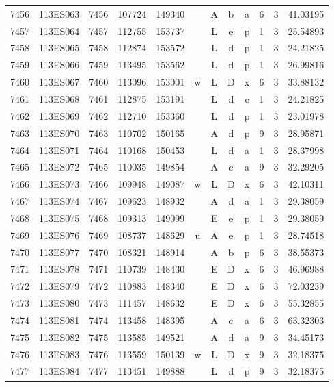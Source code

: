 \begin{tabular}{|*{12}{c|}}
7456 & 113ES063 & 7456 & 107724 & 149340 &  & A & b & a & 6 & 3 & 41.03195 \\ 
7457 & 113ES064 & 7457 & 112755 & 153737 &  & L & e & p & 1 & 3 & 25.54893 \\ 
7458 & 113ES065 & 7458 & 112874 & 153572 &  & L & d & p & 1 & 3 & 24.21825 \\ 
7459 & 113ES066 & 7459 & 113495 & 153562 &  & L & d & p & 1 & 3 & 26.99816 \\ 
7460 & 113ES067 & 7460 & 113096 & 153001 & w & L & D & x & 6 & 3 & 33.88132 \\ 
7461 & 113ES068 & 7461 & 112875 & 153191 &  & L & d & c & 1 & 3 & 24.21825 \\ 
7462 & 113ES069 & 7462 & 112710 & 153360 &  & L & d & p & 1 & 3 & 23.01978 \\ 
7463 & 113ES070 & 7463 & 110702 & 150165 &  & A & d & p & 9 & 3 & 28.95871 \\ 
7464 & 113ES071 & 7464 & 110168 & 150453 &  & L & d & a & 1 & 3 & 28.37998 \\ 
7465 & 113ES072 & 7465 & 110035 & 149854 &  & A & c & a & 9 & 3 & 32.29205 \\ 
7466 & 113ES073 & 7466 & 109948 & 149087 & w & L & D & x & 6 & 3 & 42.10311 \\ 
7467 & 113ES074 & 7467 & 109623 & 148932 &  & A & d & a & 1 & 3 & 29.38059 \\ 
7468 & 113ES075 & 7468 & 109313 & 149099 &  & E & e & p & 1 & 3 & 29.38059 \\ 
7469 & 113ES076 & 7469 & 108737 & 148629 & u & A & e & p & 1 & 3 & 28.74518 \\ 
7470 & 113ES077 & 7470 & 108321 & 148914 &  & A & b & p & 6 & 3 & 38.55373 \\ 
7471 & 113ES078 & 7471 & 110739 & 148430 &  & E & D & x & 6 & 3 & 46.96988 \\ 
7472 & 113ES079 & 7472 & 110883 & 148340 &  & E & D & x & 6 & 3 & 72.03239 \\ 
7473 & 113ES080 & 7473 & 111457 & 148632 &  & E & D & x & 6 & 3 & 55.32855 \\ 
7474 & 113ES081 & 7474 & 113458 & 148395 &  & A & c & a & 6 & 3 & 63.32303 \\ 
7475 & 113ES082 & 7475 & 113585 & 149521 &  & A & d & a & 9 & 3 & 34.45173 \\ 
7476 & 113ES083 & 7476 & 113559 & 150139 & w & L & D & x & 9 & 3 & 32.18375 \\ 
7477 & 113ES084 & 7477 & 113451 & 149888 &  & L & d & p & 9 & 3 & 32.18375 \\ 

\end{tabular}
